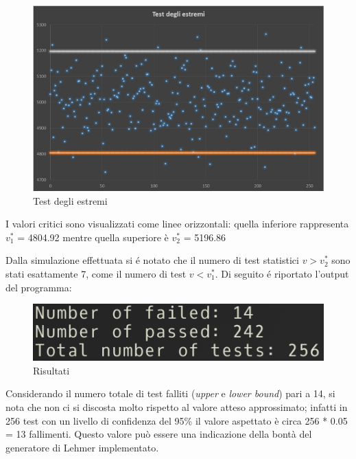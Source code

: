 \begin{figure}[H]
 \begin{center}
  \includegraphics[scale=0.45]{img/test.png}
  \caption[Test degli estremi]{Test degli estremi}
  \end{center}
\end{figure}

\vspace{0.5cm}
I valori critici sono visualizzati come linee orizzontali: quella inferiore rappresenta
$v_1^{*}$ = 4804.92 mentre quella superiore è $v_2^{*}$ = 5196.86

Dalla simulazione effettuata si \'e notato che il numero di test statistici $v > v_2^{*}$ sono stati esattamente 7, come il numero di test $v < v_1^{*}$. Di seguito \'e riportato l'output del programma:

\begin{figure}[H]
  \begin{center}
  \includegraphics[scale=0.7]{img/test_estremi.png}
  \caption[Risultati]{Risultati}
  \end{center}
\end{figure}


Considerando il numero totale di test falliti (\textit{upper} e \textit{lower bound}) pari a 14, si nota che non
ci si discosta molto rispetto al valore atteso approssimato; infatti in 256 test con un livello di
confidenza del 95\% il valore aspettato è circa 256 * 0.05 = 13 fallimenti. Questo valore pu\`o 
essere una indicazione della bont\`a del generatore di Lehmer implementato.
